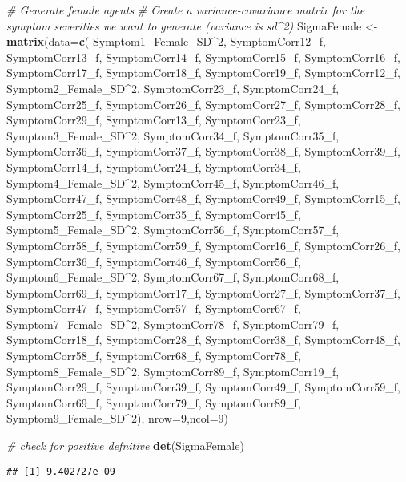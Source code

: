 \documentclass[]{article}
\newenvironment{Shaded}{\begin{snugshade}}{\end{snugshade}}
\newcommand{\KeywordTok}[1]{\textcolor[rgb]{0.13,0.29,0.53}{\textbf{#1}}}
\newcommand{\DataTypeTok}[1]{\textcolor[rgb]{0.13,0.29,0.53}{#1}}
\newcommand{\DecValTok}[1]{\textcolor[rgb]{0.00,0.00,0.81}{#1}}
\newcommand{\StringTok}[1]{\textcolor[rgb]{0.31,0.60,0.02}{#1}}
\newcommand{\CommentTok}[1]{\textcolor[rgb]{0.56,0.35,0.01}{\textit{#1}}}
\newcommand{\OperatorTok}[1]{\textcolor[rgb]{0.81,0.36,0.00}{\textbf{#1}}}
\newcommand{\NormalTok}[1]{#1}
\begin{document}
\begin{Shaded}
\begin{Highlighting}[]
\CommentTok{# Generate female agents}
\CommentTok{# Create a variance-covariance matrix for the symptom severities we want to generate (variance is sd^2)}
\NormalTok{SigmaFemale <-}\StringTok{ }\KeywordTok{matrix}\NormalTok{(}\DataTypeTok{data=}\KeywordTok{c}\NormalTok{(}
\NormalTok{  Symptom1_Female_SD}\OperatorTok{^}\DecValTok{2}\NormalTok{, SymptomCorr12_f, SymptomCorr13_f, SymptomCorr14_f, SymptomCorr15_f, SymptomCorr16_f, SymptomCorr17_f, SymptomCorr18_f, SymptomCorr19_f,}
\NormalTok{  SymptomCorr12_f, Symptom2_Female_SD}\OperatorTok{^}\DecValTok{2}\NormalTok{, SymptomCorr23_f, SymptomCorr24_f, SymptomCorr25_f, SymptomCorr26_f, SymptomCorr27_f, SymptomCorr28_f, SymptomCorr29_f,}
\NormalTok{  SymptomCorr13_f, SymptomCorr23_f, Symptom3_Female_SD}\OperatorTok{^}\DecValTok{2}\NormalTok{, SymptomCorr34_f, SymptomCorr35_f, SymptomCorr36_f, SymptomCorr37_f, SymptomCorr38_f, SymptomCorr39_f,}
\NormalTok{  SymptomCorr14_f, SymptomCorr24_f, SymptomCorr34_f, Symptom4_Female_SD}\OperatorTok{^}\DecValTok{2}\NormalTok{, SymptomCorr45_f, SymptomCorr46_f, SymptomCorr47_f, SymptomCorr48_f, SymptomCorr49_f,}
\NormalTok{  SymptomCorr15_f, SymptomCorr25_f, SymptomCorr35_f, SymptomCorr45_f, Symptom5_Female_SD}\OperatorTok{^}\DecValTok{2}\NormalTok{, SymptomCorr56_f, SymptomCorr57_f, SymptomCorr58_f, SymptomCorr59_f,}
\NormalTok{  SymptomCorr16_f, SymptomCorr26_f, SymptomCorr36_f, SymptomCorr46_f, SymptomCorr56_f, Symptom6_Female_SD}\OperatorTok{^}\DecValTok{2}\NormalTok{, SymptomCorr67_f, SymptomCorr68_f, SymptomCorr69_f,}
\NormalTok{  SymptomCorr17_f, SymptomCorr27_f, SymptomCorr37_f, SymptomCorr47_f, SymptomCorr57_f, SymptomCorr67_f, Symptom7_Female_SD}\OperatorTok{^}\DecValTok{2}\NormalTok{, SymptomCorr78_f, SymptomCorr79_f,}
\NormalTok{  SymptomCorr18_f, SymptomCorr28_f, SymptomCorr38_f, SymptomCorr48_f, SymptomCorr58_f, SymptomCorr68_f, SymptomCorr78_f, Symptom8_Female_SD}\OperatorTok{^}\DecValTok{2}\NormalTok{, SymptomCorr89_f,}
\NormalTok{  SymptomCorr19_f, SymptomCorr29_f, SymptomCorr39_f, SymptomCorr49_f, SymptomCorr59_f, SymptomCorr69_f, SymptomCorr79_f, SymptomCorr89_f, Symptom9_Female_SD}\OperatorTok{^}\DecValTok{2}\NormalTok{),     }
  \DataTypeTok{nrow=}\DecValTok{9}\NormalTok{,}\DataTypeTok{ncol=}\DecValTok{9}\NormalTok{)}

\CommentTok{# check for positive defnitive}
\KeywordTok{det}\NormalTok{(SigmaFemale)}
\end{Highlighting}
\end{Shaded}

\begin{verbatim}
## [1] 9.402727e-09
\end{verbatim}
\end{document}
